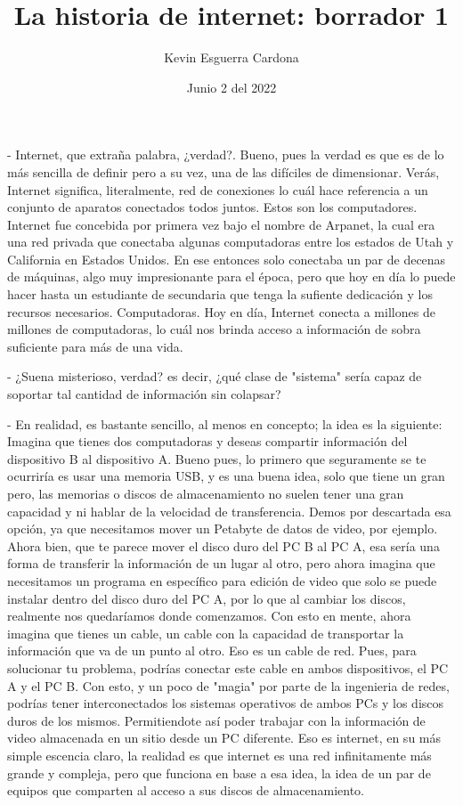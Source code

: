\documentclass[12pt, letterpaper]{article}
\title{La historia de internet: borrador 1}
\author{Kevin  Esguerra Cardona}
\date{Junio 2 del 2022}
\begin{document}
\maketitle

- Internet, que extraña palabra, ¿verdad?. Bueno, pues la verdad es que es de lo más sencilla de definir pero a su vez, una de las difíciles de dimensionar.
Verás, Internet significa, literalmente, red de conexiones lo cuál hace referencia a un conjunto de aparatos conectados todos juntos. Estos son los computadores.
Internet fue concebida por primera vez bajo el nombre de Arpanet, la cual era una red privada que conectaba algunas computadoras entre los estados de Utah y California
en Estados Unidos. En ese entonces solo conectaba un par de decenas de máquinas, algo muy impresionante para el época, pero que hoy en día lo puede hacer hasta un estudiante
de secundaria que tenga la sufiente dedicación y los recursos necesarios. Computadoras. Hoy en día, Internet conecta a millones de millones de computadoras, 
lo cuál nos brinda acceso a información de sobra suficiente para más de una vida.

- ¿Suena misterioso, verdad? es decir, ¿qué clase de "sistema" sería capaz de soportar tal cantidad de información sin colapsar?

- En realidad, es bastante sencillo, al menos en concepto; la idea es la siguiente: Imagina que tienes dos computadoras y deseas compartir información del 
dispositivo B al dispositivo A. Bueno pues, lo primero que seguramente se te ocurriría es usar una memoria USB, y es una buena idea, solo que tiene un gran pero, las memorias o
discos de almacenamiento no suelen tener una gran capacidad y ni hablar de la velocidad de transferencia. Demos por descartada esa opción, ya que necesitamos mover un Petabyte
de datos de video, por ejemplo. Ahora bien, que te parece mover el disco duro del PC B al PC A, esa sería una forma de transferir la información de un lugar al otro, pero ahora
imagina que necesitamos un programa en específico para edición de video que solo se puede instalar dentro del disco duro del PC A, por lo que al cambiar los discos, realmente 
nos quedaríamos donde comenzamos. Con esto en mente, ahora imagina que tienes un cable, un cable con la capacidad de transportar la información que va de un punto al otro. 
Eso es un cable de red. Pues, para solucionar tu problema, podrías conectar este cable en ambos dispositivos, el PC A y el PC B. Con esto, y un poco de "magia" por parte de la 
ingenieria de redes, podrías tener interconectados los sistemas operativos de ambos PCs y los discos duros de los mismos. Permitiendote así poder trabajar con la información de 
video almacenada en un sitio desde un PC diferente. Eso es internet, en su más simple escencia claro, la realidad es que internet es una red infinitamente más grande y compleja, 
pero que funciona en base a esa idea, la idea de un par de equipos que comparten al acceso a sus discos de almacenamiento.
\end{document}
